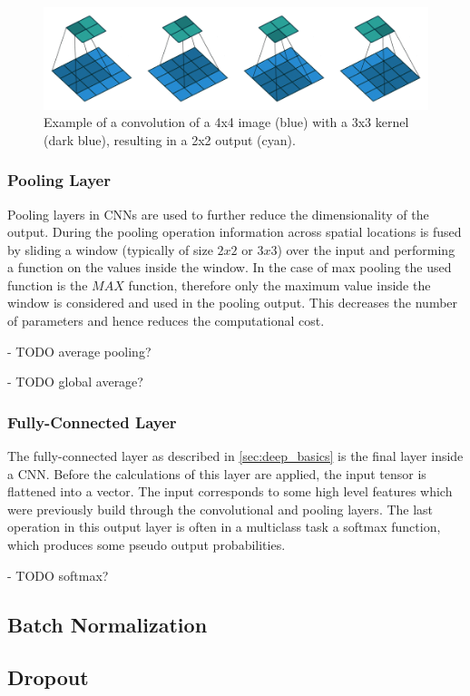 \begin{figure}
\begin{center}
    \includegraphics[width=16cm]{imgs/conv_example_full.png}
    \caption{Example of a convolution of a 4x4 image (blue) with a 3x3  kernel (dark blue), resulting in a 2x2 output (cyan). \cite{conv_arithmetic}}
    \label{fig:conv_example}
\end{center}
\end{figure}





\subsubsection{Pooling Layer}
Pooling layers in \ac{CNNs} are used to further reduce the dimensionality of the output.
During the pooling operation information across spatial locations is fused by sliding a window (typically of size $2x2$ or $3x3$) over the input and performing a function on the values inside the window.
In the case of max pooling the used function is the $MAX$ function, therefore only the maximum value inside the window is considered and used in the pooling output.
This decreases the number of parameters and hence reduces the computational cost. \cite{dl}

- TODO average pooling?

- TODO global average?

\subsubsection{Fully-Connected Layer}
The fully-connected layer as described in \ref{sec:deep_basics} is the final layer inside a \ac{CNN}.
Before the calculations of this layer are applied, the input tensor is flattened into a vector.
The input corresponds to some high level features which were previously build through the convolutional and pooling layers.
The last operation in this output layer is often in a multiclass task a softmax function, which produces some pseudo output probabilities.


- TODO softmax?

\subsection{Batch Normalization}

\subsection{Dropout}

